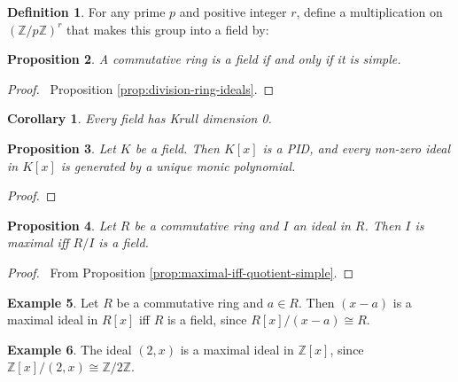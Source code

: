 \documentclass{book}
\let\qed\relax
\newtheorem{prop}{Proposition}[chapter]
\newtheorem{cor}{Corollary}[prop]
\theoremstyle{definition}
\newtheorem{df}[prop]{Definition}
\newtheorem{ex}[prop]{Example}
\begin{document}
\begin{df}
For any prime $p$ and positive integer $r$, define a multiplication on $(\mathbb{Z} / p \mathbb{Z})^r$ that makes this group into a field by:
\end{df}

\begin{prop}
A commutative ring is a field if and only if it is simple.
\end{prop}

\begin{proof}
\pf\ Proposition \ref{prop:division-ring-ideals}. \qed
\end{proof}

\begin{cor}
Every field has Krull dimension 0.
\end{cor}

\begin{prop}
Let $K$ be a field. Then $K[x]$ is a PID, and every non-zero ideal in $K[x]$ is generated by a unique monic polynomial.
\end{prop}

\begin{proof}
\pf
{}
\qed
\end{proof}

\begin{prop}
Let $R$ be a commutative ring and $I$ an ideal in $R$. Then $I$ is maximal iff $R/I$ is a field.
\end{prop}

\begin{proof}
\pf\ From Proposition \ref{prop:maximal-iff-quotient-simple}. \qed
\end{proof}

\begin{ex}
\label{ex:x-minus-a-maximal}
Let $R$ be a commutative ring and $a \in R$. Then $(x-a)$ is a maximal ideal in $R[x]$ iff $R$ is a field, since $R[x]/(x-a) \cong R$.
\end{ex}

\begin{ex}
The ideal $(2,x)$ is a maximal ideal in $\mathbb{Z}[x]$, since $\mathbb{Z}[x] / (2,x) \cong \mathbb{Z} / 2 \mathbb{Z}$.
\end{ex}
\end{document}

